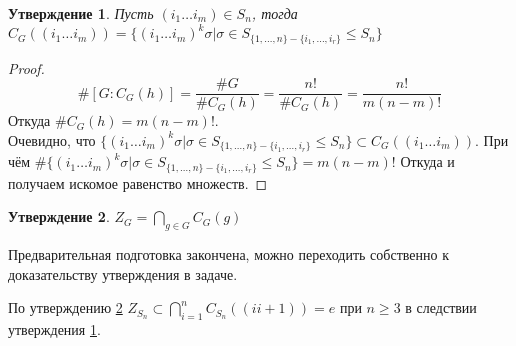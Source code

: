 \documentclass{article}
\newtheorem{statement}{Утверждение}
\newcommand{\icycle}[3]{(#1_{#2} \dots #1_{#3})}
\newcommand{\range}[2]{\{#1, \dots, #2\}}
\newcommand{\irange}[3]{#1_{#2}, \dots, #1_{#3}}
\newcommand{\subgroup}{\leq}
\begin{document}
\begin{statement}
\label{sec2:cyclecentralizer}
Пусть $\icycle{i}{1}{m} \in S_n$, тогда $C_G(\icycle{i}{1}{m}) = \{\icycle{i}{1}{m}^k \sigma | \sigma \in S_{\range{1}{n} - \{\irange{i}{1}{r}\}} \subgroup S_n\}$
\end{statement}

\begin{proof}
    \begin{equation*}
        \#[G: C_G(h)] = \frac{\#G}{\#C_G(h)} = \frac{n!}{\#C_G(h)} = \frac{n!}{m(n - m)!}    
    \end{equation*}
Откуда $\#C_G(h) = m (n - m)!$. \\
Очевидно, что $\{\icycle{i}{1}{m}^k \sigma | \sigma \in S_{\range{1}{n} - \{\irange{i}{1}{r}\}} \subgroup S_n\} \subset C_G(\icycle{i}{1}{m})$.
При чём $\#\{\icycle{i}{1}{m}^k \sigma | \sigma \in S_{\range{1}{n} - \{\irange{i}{1}{r}\}} \subgroup S_n\} = m (n - m)!$
Откуда и получаем искомое равенство множеств.
\end{proof}

\begin{statement}
\label{sec2:center}
$Z_{G} = \bigcap_{g \in G}C_G(g)$
\end{statement}

Предварительная подготовка закончена, 
можно переходить собственно к доказательству утверждения в задаче. 

По утверждению \ref{sec2:center} $Z_{S_n} \subset \bigcap_{i = 1}^{n}C_{S_n}((i i+1)) = e$ 
при $n \geq 3$ в следствии утверждения \ref{sec2:cyclecentralizer}.
\end{document}
